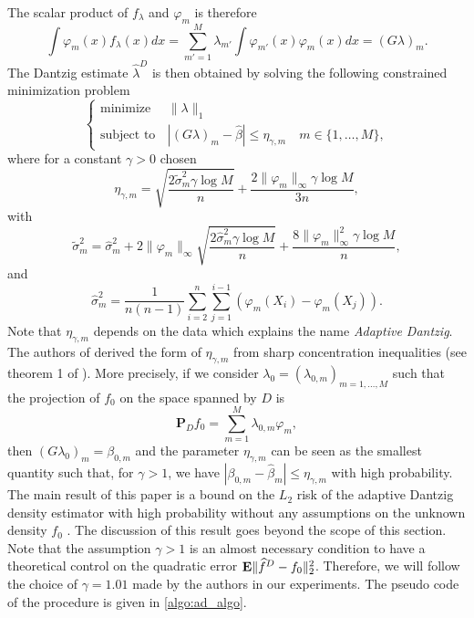 The scalar product of $f_{\lambda}$ and $\varphi_m$ is therefore
\begin{equation}
    \int\varphi_m(x)f_{\lambda}(x)dx = \sum_{m'=1}^M\lambda_{m'}\int\varphi_{m'}(x)\varphi_m(x)dx = (G\lambda)_m.
\end{equation}
The Dantzig estimate $\hat\lambda^D$ is then obtained by solving the following constrained minimization problem
\begin{equation*}
    \left\{
    \begin{array}{ll}
        \text{minimize}\, &\|\lambda\|_1 \\
        \text{subject to}\, &|(G\lambda)_m-\hat\beta|\leq \eta_{\gamma,m} \quad m\in \{1,\dots,M\},
    \end{array} \right.
\end{equation*}
where for a constant $\gamma > 0$ chosen 
\begin{equation}
    \eta_{\gamma,m} = \sqrt{\frac{2\tilde\sigma_m^2\gamma\log{M}}{n}}+ \frac{2\|\varphi_m\|_{\infty}\gamma\log{M}}{3n},
\end{equation}
with
\begin{equation}
    \tilde\sigma_m^2 = \hat\sigma_m^2+2\|\varphi_m \|_{\infty}\sqrt{\frac{2\hat\sigma_m^2\gamma\log{M}}{n}}+ \frac{8\|\varphi_m\|_{\infty}^2\gamma\log{M}}{n},
\end{equation}
and
\begin{equation}
    \hat\sigma^2_m = \frac{1}{n(n-1)}\sum_{i=2}^n\sum_{j=1}^{i-1}(\varphi_m(X_i)-\varphi_m(X_j)).
\end{equation}
Note that $\eta_{\gamma,m}$ depends on the data which explains the name \textit{Adaptive Dantzig}. The authors of \cite{Bertin} derived the form of $\eta_{\gamma,m}$ from sharp concentration inequalities (see theorem 1 of \cite{Bertin}). More precisely, if we consider $\lambda_0=(\lambda_{0,m})_{m=1,\dots,M}$ such that the projection of $f_0$ on the space spanned by $D$ is
\begin{equation}
    \textbf{P}_{D}f_0=\sum_{m=1}^M\lambda_{0,m}\varphi_m,
\end{equation}
then $(G\lambda_0)_m=\beta_{0,m}$  and the parameter $\eta_{\gamma,m}$ can be seen as the smallest quantity such that, for $\gamma > 1$, we have $|\beta_{0,m}-\hat\beta_m|\leq \eta_{\gamma,m}$ with high probability. The main result of this paper is a bound on the $L_2$ risk of the adaptive Dantzig density estimator with high probability without any assumptions on the unknown density $f_0$ . The discussion of this result goes beyond the scope of this section. Note that the assumption $\gamma > 1$ is an almost necessary condition to have a theoretical control on the quadratic error $\mathbf E\|\widehat f^D-f_0 \|^2_2$. Therefore, we will follow the choice of $\gamma=1.01$ made by the authors in our experiments. The pseudo code of the procedure is given in \cref{algo:ad_algo}. 

